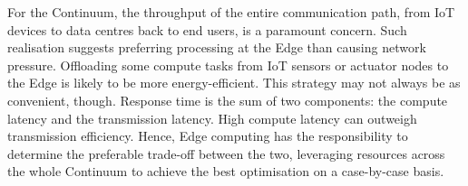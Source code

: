 For the Continuum, the throughput of the entire communication path, from IoT devices to data centres back to end users, is a paramount concern. Such realisation suggests preferring processing at the Edge than causing network pressure. 
Offloading some compute tasks from IoT sensors or actuator nodes to the Edge is likely to be more energy-efficient. 
This strategy may not always be as convenient, though. 
Response time is the sum of two components: the compute latency and the transmission latency. High compute latency can outweigh transmission efficiency. 
Hence, Edge computing has the responsibility to determine the preferable trade-off between the two, leveraging resources across the whole Continuum to achieve the best optimisation on a case-by-case basis.


